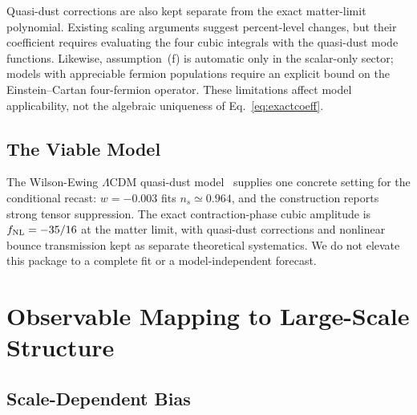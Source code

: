 \documentclass[aps,prd,twocolumn,superscriptaddress,showpacs,preprintnumbers,nofootinbib,longbibliography,floatfix]{revtex4-2}
\newcommand{\fnl}{f_{\rm NL}}
\begin{document}
Quasi-dust corrections are also kept separate from the exact matter-limit polynomial. Existing scaling arguments suggest percent-level changes, but their coefficient requires evaluating the four cubic integrals with the quasi-dust mode functions. Likewise, assumption~(f) is automatic only in the scalar-only sector; models with appreciable fermion populations require an explicit bound on the Einstein--Cartan four-fermion operator. These limitations affect model applicability, not the algebraic uniqueness of Eq.~\eqref{eq:exactcoeff}.
\subsection{The Viable Model}

The Wilson-Ewing $\Lambda$CDM quasi-dust model~\cite{WilsonEwing:2012} supplies one concrete setting for the conditional recast: $w=-0.003$ fits $n_s\simeq0.964$, and the construction reports strong tensor suppression. The exact contraction-phase cubic amplitude is $\fnl=-35/16$ at the matter limit, with quasi-dust corrections and nonlinear bounce transmission kept as separate theoretical systematics. We do not elevate this package to a complete fit or a model-independent forecast.

\section{Observable Mapping to Large-Scale Structure}
\label{sec:lss}

\subsection{Scale-Dependent Bias}
\end{document}
